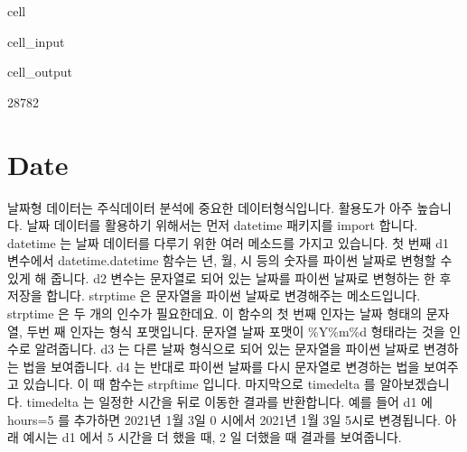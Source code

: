 \documentclass[letterpaper,10pt,english]{jupyterBook}
\begin{document}
\begin{sphinxuseclass}{cell}\begin{sphinxVerbatimInput}

\begin{sphinxuseclass}{cell_input}
\begin{sphinxVerbatim}[commandchars=\\\{\}]
  
  
\end{sphinxVerbatim}

\end{sphinxuseclass}\end{sphinxVerbatimInput}
\begin{sphinxVerbatimOutput}

\begin{sphinxuseclass}{cell_output}
\begin{sphinxVerbatim}[commandchars=\\\{\}]
28782
\end{sphinxVerbatim}

\end{sphinxuseclass}\end{sphinxVerbatimOutput}

\end{sphinxuseclass}

\part{Date}
\label{\detokenize{chapter2/2.1.1_Python_Basics:date}}
\sphinxAtStartPar
날짜형 데이터는 주식데이터 분석에 중요한 데이터형식입니다. 활용도가 아주 높습니다. 날짜 데이터를 활용하기 위해서는 먼저 datetime 패키지를 import 합니다. datetime 는 날짜 데이터를 다루기 위한 여러 메소드를 가지고 있습니다. 첫 번째 d1 변수에서 datetime.datetime 함수는 년, 월, 시 등의 숫자를 파이썬 날짜로 변형할 수 있게 해 줍니다. d2 변수는 문자열로 되어 있는 날짜를 파이썬 날짜로 변형하는 한 후 저장을 합니다. strptime 은 문자열을 파이썬 날짜로 변경해주는 메소드입니다. strptime 은 두 개의 인수가 필요한데요. 이 함수의 첫 번째 인자는 날짜 형태의 문자열, 두번 째 인자는 형식 포맷입니다. 문자열 날짜 포맷이 \%Y\sphinxhyphen{}\%m\sphinxhyphen{}\%d 형태라는 것을 인수로 알려줍니다. d3 는 다른 날짜 형식으로 되어 있는 문자열을 파이썬 날짜로 변경하는 법을 보여줍니다. d4 는 반대로 파이썬 날짜를 다시 문자열로 변경하는 법을 보여주고 있습니다. 이 때 함수는 strpftime 입니다. 마지막으로 timedelta 를 알아보겠습니다. timedelta 는 일정한 시간을 뒤로 이동한 결과를 반환합니다. 예를 들어 d1 에 hours=5 를 추가하면 2021년 1월 3일 0 시에서 2021년 1월 3일 5시로 변경됩니다. 아래 예시는 d1 에서 5 시간을 더 했을 때, 2 일 더했을 때 결과를 보여줍니다.
\end{document}
